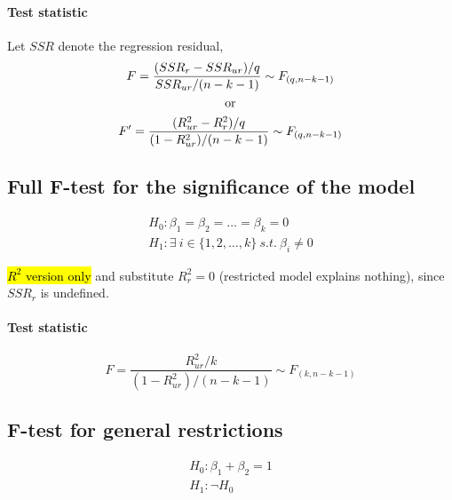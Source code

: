 \documentclass[]{article}
\begin{document}
    	\paragraph{Test statistic} Let $SSR$ denote the regression residual,
    	\begin{gather*}
    		F = \frac{(SSR_r - SSR_{ur})/q}{SSR_{ur}/(n-k-1)} \sim F_{(q, n-k-1)} \\
    		\text{{or}} \\
    		F' = \frac{(R^2_{ur} - R^2_r)/q}{(1-R^2_{ur})/(n-k-1)} \sim F_{(q, n-k-1)}
    	\end{gather*}
    	
    	\subsection{Full F-test for the significance of the model}
    	\begin{gather*}
    		H_0: \beta_1 = \beta_2 = \dots = \beta_k = 0 \\
    		H_1: \exists\ i \in \{1, 2, \dots ,k\}\ s.t.\ \beta_i \neq 0
    	\end{gather*}
    	\begin{remark}
    		\hl{$R^2$ version only} and substitute $R^2_{r} = 0$ (restricted model explains nothing), since $SSR_{r}$ is undefined.
    	\end{remark}
    	\paragraph{Test statistic}
    	\[
    		F = \frac{R^2_{ur}/k}{(1-R^2_{ur})/(n-k-1)} \sim F_{(k, n-k-1)}
    	\]
    	
    	\subsection{F-test for general restrictions}
    	\begin{gather*}
    		H_0: \beta_1 + \beta_2 = 1 \\
    		H_1: \neg H_0
    	\end{gather*}
\end{document}
